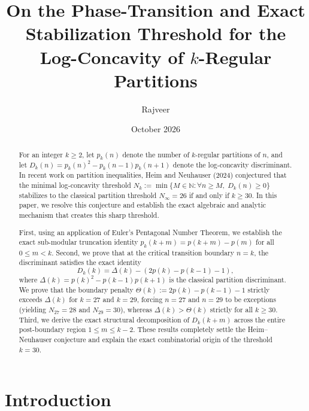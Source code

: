 \documentclass[11pt,reqno]{amsart}
\title[Log-Concavity Phase-Transition for $k$-Regular Partitions]{On the Phase-Transition and Exact Stabilization Threshold for the Log-Concavity of $k$-Regular Partitions}
\author{Rajveer}
\date{October 2026}
\theoremstyle{definition}
\numberwithin{equation}{section}
\begin{document}
\begin{abstract}
For an integer $k \ge 2$, let $p_k(n)$ denote the number of $k$-regular partitions of $n$, and let $D_k(n) = p_k(n)^2 - p_k(n-1)p_k(n+1)$ denote the log-concavity discriminant. In recent work on partition inequalities, Heim and Neuhauser (2024) conjectured that the minimal log-concavity threshold $N_k := \min \{ M \in \mathbb{N} : \forall n \ge M, \; D_k(n) \ge 0\}$ stabilizes to the classical partition threshold $N_\infty = 26$ if and only if $k \ge 30$. In this paper, we resolve this conjecture and establish the exact algebraic and analytic mechanism that creates this sharp threshold.

First, using an application of Euler's Pentagonal Number Theorem, we establish the exact sub-modular truncation identity $p_k(k+m) = p(k+m) - p(m)$ for all $0 \le m < k$. Second, we prove that at the critical transition boundary $n = k$, the discriminant satisfies the exact identity
\[
D_k(k) = \Delta(k) - (2p(k) - p(k-1) - 1),
\]
where $\Delta(k) = p(k)^2 - p(k-1)p(k+1)$ is the classical partition discriminant. We prove that the boundary penalty $\Theta(k) := 2p(k) - p(k-1) - 1$ strictly exceeds $\Delta(k)$ for $k = 27$ and $k = 29$, forcing $n = 27$ and $n = 29$ to be exceptions (yielding $N_{27} = 28$ and $N_{29} = 30$), whereas $\Delta(k) > \Theta(k)$ strictly for all $k \ge 30$. Third, we derive the exact structural decomposition of $D_k(k+m)$ across the entire post-boundary region $1 \le m \le k-2$. These results completely settle the Heim--Neuhauser conjecture and explain the exact combinatorial origin of the threshold $k = 30$.
\end{abstract}

\maketitle

\section{Introduction}
\end{document}

